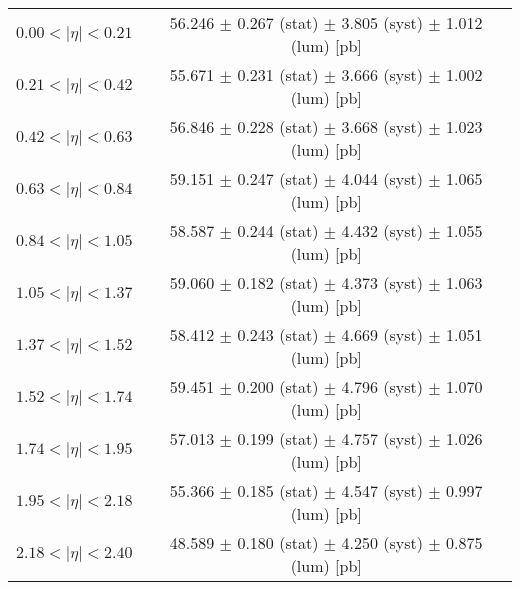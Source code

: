 \begin{tabular}{lc}
\hline
$0.00 < |\eta| <0.21$          & 56.246 $\pm$ 0.267 (stat) $\pm$ 3.805 (syst) $\pm$ 1.012 (lum) [pb]  \\
$0.21 < |\eta| <0.42$          & 55.671 $\pm$ 0.231 (stat) $\pm$ 3.666 (syst) $\pm$ 1.002 (lum) [pb]  \\
$0.42 < |\eta| <0.63$          & 56.846 $\pm$ 0.228 (stat) $\pm$ 3.668 (syst) $\pm$ 1.023 (lum) [pb]  \\
$0.63 < |\eta| <0.84$          & 59.151 $\pm$ 0.247 (stat) $\pm$ 4.044 (syst) $\pm$ 1.065 (lum) [pb]  \\
$0.84 < |\eta| <1.05$          & 58.587 $\pm$ 0.244 (stat) $\pm$ 4.432 (syst) $\pm$ 1.055 (lum) [pb]  \\
$1.05 < |\eta| <1.37$          & 59.060 $\pm$ 0.182 (stat) $\pm$ 4.373 (syst) $\pm$ 1.063 (lum) [pb]  \\
$1.37 < |\eta| <1.52$          & 58.412 $\pm$ 0.243 (stat) $\pm$ 4.669 (syst) $\pm$ 1.051 (lum) [pb]  \\
$1.52 < |\eta| <1.74$          & 59.451 $\pm$ 0.200 (stat) $\pm$ 4.796 (syst) $\pm$ 1.070 (lum) [pb]  \\
$1.74 < |\eta| <1.95$          & 57.013 $\pm$ 0.199 (stat) $\pm$ 4.757 (syst) $\pm$ 1.026 (lum) [pb]  \\
$1.95 < |\eta| <2.18$          & 55.366 $\pm$ 0.185 (stat) $\pm$ 4.547 (syst) $\pm$ 0.997 (lum) [pb]  \\
$2.18 < |\eta| <2.40$          & 48.589 $\pm$ 0.180 (stat) $\pm$ 4.250 (syst) $\pm$ 0.875 (lum) [pb]  \\
\hline
\end{tabular}
